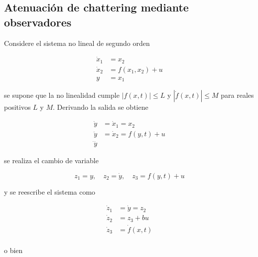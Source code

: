 \begin{flushright}
\end{flushright}

\subsection{Atenuación de chattering mediante observadores}

Considere el sistema no lineal de segundo orden

\begin{equation*}
    \begin{aligned}
        \dot{x}_1 &= x_2 \\
        \dot{x}_2 &= f(x_1, x_2) + u \\
        y &= x_1
    \end{aligned}
\end{equation*}

se supone que la no linealidad cumple \(|f(x,t)|\leq L\) y \(|\dot{f}(x,t)|\leq M\) para reales positivos \(L\) y \(M\). Derivando la salida se obtiene

\begin{equation*}
    \begin{aligned}
        \dot{y} &=  \dot{x}_1 = x_2 \\
        \ddot{y} &= \dot{x}_2 = f(y, t) + u\\
        \dddot{y}
    \end{aligned}
\end{equation*}

se realiza el cambio de variable

\begin{equation*}
    z_1 = y, \quad z_2 = \dot{y}, \quad z_3 = f(y, t) + u
\end{equation*}

y se reescribe el sistema como

\begin{equation*}
    \begin{aligned}
        \dot{z}_1 &= \dot{y} = z_2 \\
        \dot{z}_2 &= z_3 +bu\\
        \dot{z}_3 &= \dot{f}(x,t) \\
    \end{aligned}
\end{equation*}

o bien


